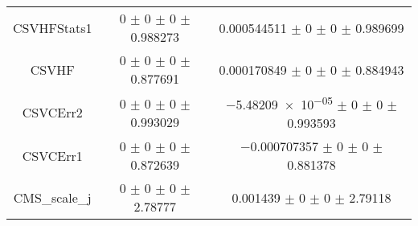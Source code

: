 \begin{table}
\begin{tabular}{ccc}
CSVHFStats1 & \num{0} $\pm$ \num{0} $\pm$ \num{0} $\pm$ \num{0.988273} & \num{0.000544511} $\pm$ \num{0} $\pm$ \num{0} $\pm$ \num{0.989699}\\
CSVHF & \num{0} $\pm$ \num{0} $\pm$ \num{0} $\pm$ \num{0.877691} & \num{0.000170849} $\pm$ \num{0} $\pm$ \num{0} $\pm$ \num{0.884943}\\
CSVCErr2 & \num{0} $\pm$ \num{0} $\pm$ \num{0} $\pm$ \num{0.993029} & \num{-5.48209e-05} $\pm$ \num{0} $\pm$ \num{0} $\pm$ \num{0.993593}\\
CSVCErr1 & \num{0} $\pm$ \num{0} $\pm$ \num{0} $\pm$ \num{0.872639} & \num{-0.000707357} $\pm$ \num{0} $\pm$ \num{0} $\pm$ \num{0.881378}\\
CMS\_scale\_j & \num{0} $\pm$ \num{0} $\pm$ \num{0} $\pm$ \num{2.78777} & \num{0.001439} $\pm$ \num{0} $\pm$ \num{0} $\pm$ \num{2.79118}\\
\bottomrule
\end{tabular}
\end{table}